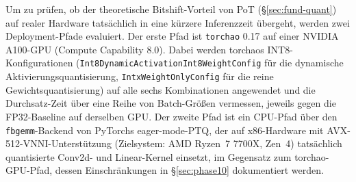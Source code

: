 Um zu prüfen, ob der theoretische Bitshift-Vorteil von PoT (\S\ref{sec:fund-quant}) auf realer Hardware tatsächlich in eine kürzere Inferenzzeit übergeht, werden zwei Deployment-Pfade evaluiert. Der erste Pfad ist \texttt{torchao} 0.17 auf einer NVIDIA A100-GPU (Compute Capability 8.0). Dabei werden torchaos INT8-Konfigurationen (\texttt{Int8DynamicActivationInt8WeightConfig} für die dynamische Aktivierungsquantisierung, \texttt{IntxWeightOnlyConfig} für die reine Gewichtsquantisierung) auf alle sechs Kombinationen angewendet und die Durchsatz-Zeit über eine Reihe von Batch-Größen vermessen, jeweils gegen die FP32-Baseline auf derselben GPU. Der zweite Pfad ist ein CPU-Pfad über den \texttt{fbgemm}-Backend \citep{khudia_fbgemm_2021} von PyTorchs eager-mode-PTQ, der auf x86-Hardware mit AVX-512-VNNI-Unterstützung (Zielsystem: AMD Ryzen~7 7700X, Zen~4) tatsächlich quantisierte Conv2d- und Linear-Kernel einsetzt, im Gegensatz zum torchao-GPU-Pfad, dessen Einschränkungen in \S\ref{sec:phase10} dokumentiert werden.